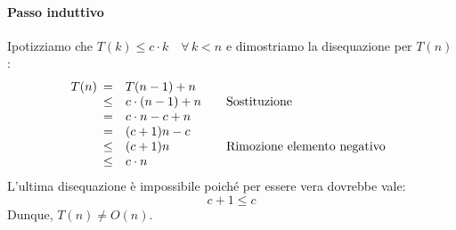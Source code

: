 \begin{eg}
    \paragraph{Passo induttivo} Ipotizziamo che $T(k)\leq c\cdot k\quad\forall\,k<n$
    e dimostriamo la disequazione per $T(n)$:
    \[T(n)\begin{array}[t]{cll}
        = & T(n-1)+n\\
        \leq & c\cdot(n-1)+n & \quad\text{Sostituzione}\\
        = & c\cdot n - c + n\\
        = & (c+1)n - c\\
        \leq & (c+1)n & \quad\text{Rimozione elemento negativo}\\
        \leq & c\cdot n
    \end{array}\]
    L'ultima disequazione è impossibile poiché per essere vera dovrebbe vale:
    \[c+1\leq c\]
    Dunque, $T(n)\neq O(n)$.
\end{eg}

